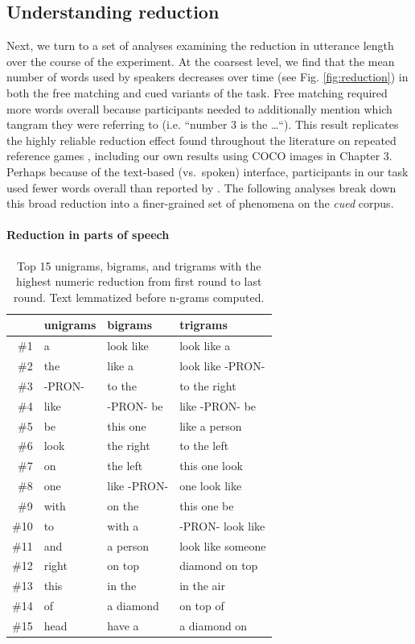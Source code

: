 \documentclass[alpha-refs]{wiley-article}
\begin{document}
\subsection{Understanding reduction}\label{reduction}

Next, we turn to a set of analyses examining the reduction in utterance length over the course of the experiment. 
At the coarsest level, we find that the mean number of words used by speakers decreases over time (see Fig. \ref{fig:reduction}) in both the free matching and cued variants of the task. 
Free matching required more words overall because participants needed to additionally mention which tangram they were referring to (i.e. ``number 3 is the \dots``).
This result replicates the highly reliable reduction effect found throughout the literature on repeated reference games \citep[e.g.][]{KraussWeinheimer64_ReferencePhrases,BrennanClark96_ConceptualPactsConversation}, including our own results using COCO images in Chapter 3. 
Perhaps because of the text-based (vs.~spoken) interface, participants in our task used fewer words overall than reported by \cite{ClarkWilkesGibbs86_ReferringCollaborative}. 
The following analyses break down this broad reduction into a finer-grained set of phenomena on the \emph{cued} corpus.

\paragraph{Reduction in parts of speech}
\begin{table}[t]
\centering
\begin{tabular}{|r||l|l|l|}
  \hline
 & unigrams & bigrams & trigrams \\ 
  \hline
\#1 & a & look like & look like a \\ 
  \#2 & the & like a & look like -PRON- \\ 
  \#3 & -PRON- & to the & to the right \\ 
  \#4 & like & -PRON- be & like -PRON- be \\ 
  \#5 & be & this one & like a person \\ 
  \#6 & look & the right & to the left \\ 
  \#7 & on & the left & this one look \\ 
  \#8 & one & like -PRON- & one look like \\ 
  \#9 & with & on the & this one be \\ 
  \#10 & to & with a & -PRON- look like \\ 
  \#11 & and & a person & look like someone \\ 
  \#12 & right & on top & diamond on top \\ 
  \#13 & this & in the & in the air \\ 
  \#14 & of & a diamond & on top of \\ 
  \#15 & head & have a & a diamond on \\ 
   \hline
\end{tabular}
\caption{Top 15 unigrams, bigrams, and trigrams with the highest numeric reduction from first round to last round. Text lemmatized before n-grams computed. } 
\label{tab:words}
\end{table}
\end{document}
